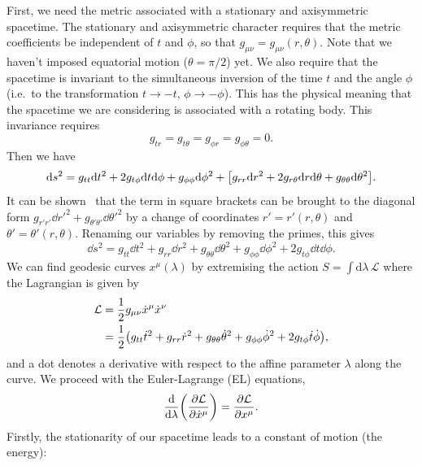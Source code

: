 First, we need the metric associated with a stationary and axisymmetric spacetime. 
The stationary and axisymmetric character requires that the metric coefficients be independent of $t$ and $\phi$, so that $g_{\mu \nu} = g_{\mu \nu}(r,\theta)$. 
Note that we haven't imposed equatorial motion ($\theta = \pi/2$) yet.
We also require that the spacetime is invariant to the simultaneous inversion of the time $t$ and the angle $\phi$ (i.e.\ to the transformation $t \rightarrow -t$, $\phi \rightarrow -\phi$). 
This has the physical meaning that the spacetime we are considering is associated with a rotating body. 
This invariance requires 
\begin{equation}
    g_{tr} = g_{t \theta} = g_{\phi r} = g_{\phi \theta} = 0.
\end{equation}
Then we have 
\begin{equation}
	\dd s^2 = g_{tt}\dd t^2 + 2g_{t \phi} \dd t \dd \phi + g_{\phi \phi}\dd \phi^2 + \qty[ g_{rr}\dd r^2 + 2g_{r \theta} \dd r \dd \theta + g_{\theta \theta} \dd \theta^2 ].
\end{equation}
It can be shown~\cite{Chandrasekhar:1985kt} that the term in square brackets can be brought to the diagonal form $g_{r'r'}\dd r'^2 +  g_{\theta' \theta'} \dd \theta'^2$ by a change of coordinates $r'=r'(r,\theta)$ and $\theta'=\theta'(r,\theta)$.
Renaming our variables by removing the primes, this gives
\begin{equation}
    \dd s^2 = g_{tt}\dd t^2 + g_{rr}\dd r^2 + g_{\theta \theta}\dd \theta^2 + g_{\phi \phi}\dd \phi^2 + 2g_{t \phi}\dd t\dd \phi.
\end{equation}
We can find geodesic curves $x^\mu(\lambda)$ by extremising the action $S=\int\mathrm{d}\lambda\,\mathcal{L}$ where the Lagrangian is given by
\begin{align}
    \mathcal{L} &= \frac{1}{2}g_{\mu \nu} \dot{x}^\mu \dot{x}^\nu \\
    &= \frac{1}{2}\qty(g_{tt}\dot{t}^2 + g_{rr}\dot{r}^2 + g_{\theta \theta}\dot{\theta}^2 + g_{\phi \phi}\dot{\phi}^2 + 2g_{t \phi}\dot{t}\dot{\phi}), \nonumber
\end{align}
and a dot denotes a derivative with respect to the affine parameter $\lambda$ along the curve. 
We proceed with the Euler-Lagrange (EL) equations, 
\begin{equation}
    \dv{\lambda}(\pdv{\mathcal{L}}{\dot{x}^\mu}) = \pdv{\mathcal{L}}{x^\mu}.
\end{equation}
Firstly, the stationarity of our spacetime leads to a constant of motion (the energy):
